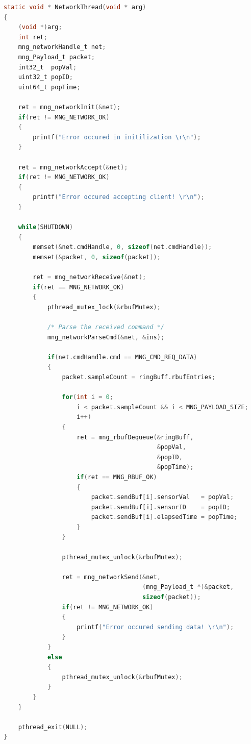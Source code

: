 \documentclass{article}
\begin{document}
\newpage
\begin{lstlisting}[language=C,
caption={Network Thread Implementation},
label={lst:network_thread}]
static void * NetworkThread(void * arg)
{
    (void *)arg;
    int ret;
    mng_networkHandle_t net;
    mng_Payload_t packet;
    int32_t  popVal;
    uint32_t popID;
    uint64_t popTime;

    ret = mng_networkInit(&net);
    if(ret != MNG_NETWORK_OK)
    {
        printf("Error occured in initilization \r\n");
    }

    ret = mng_networkAccept(&net);
    if(ret != MNG_NETWORK_OK)
    {
        printf("Error occured accepting client! \r\n");
    }

    while(SHUTDOWN)
    {
        memset(&net.cmdHandle, 0, sizeof(net.cmdHandle));
        memset(&packet, 0, sizeof(packet));

        ret = mng_networkReceive(&net);
        if(ret == MNG_NETWORK_OK)
        {
            pthread_mutex_lock(&rbufMutex);

            /* Parse the received command */
            mng_networkParseCmd(&net, &ins);

            if(net.cmdHandle.cmd == MNG_CMD_REQ_DATA)
            {
                packet.sampleCount = ringBuff.rbufEntries;

                for(int i = 0;
                    i < packet.sampleCount && i < MNG_PAYLOAD_SIZE;
                    i++)
                {
                    ret = mng_rbufDequeue(&ringBuff,
                                          &popVal,
                                          &popID,
                                          &popTime);
                    if(ret == MNG_RBUF_OK)
                    {
                        packet.sendBuf[i].sensorVal   = popVal;
                        packet.sendBuf[i].sensorID    = popID;
                        packet.sendBuf[i].elapsedTime = popTime;
                    }
                }

                pthread_mutex_unlock(&rbufMutex);

                ret = mng_networkSend(&net,
                                      (mng_Payload_t *)&packet,
                                      sizeof(packet));
                if(ret != MNG_NETWORK_OK)
                {
                    printf("Error occured sending data! \r\n");
                }
            }
            else
            {
                pthread_mutex_unlock(&rbufMutex);
            }
        }
    }

    pthread_exit(NULL);
}
\end{lstlisting}
\end{document}
